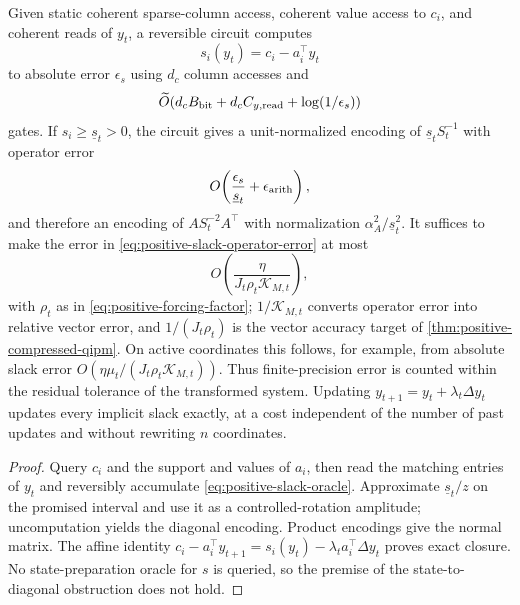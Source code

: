 \begin{theorem}
\label{thm:positive-implicit-slack}
Given static coherent sparse-column access, coherent value access to $c_i$,
and coherent reads of $y_t$, a
reversible circuit computes
\begin{equation}
 s_i(y_t)=c_i-a_i^\top y_t                                  \label{eq:positive-slack-oracle}
\end{equation}
to absolute error $\epsilon_s$ using $d_c$ column accesses and
\[
 \widetilde{O}\!\left(d_cB_{\rm bit}+d_cC_{y,{\rm read}}
                  +\log(1/\epsilon_s)\right)
\]
gates.  If
$s_i\geq\underline s_t>0$, the circuit gives a unit-normalized encoding of
$\underline s_tS_t^{-1}$ with operator error
\begin{equation}
 O\!\left(\frac{\epsilon_s}{\underline s_t}+\epsilon_{\rm arith}\right), \label{eq:positive-slack-operator-error}
\end{equation}
and therefore an encoding of $AS_t^{-2}A^\top$ with normalization
$\alpha_A^2/\underline s_t^2$.  It suffices to make the error in
\eqref{eq:positive-slack-operator-error} at most
\[
 O\!\left(\frac{\eta}{J_t\rho_t\mathcal K_{M,t}}\right),
\]
with $\rho_t$ as in \eqref{eq:positive-forcing-factor}; $1/\mathcal K_{M,t}$
converts operator error into relative vector error, and $1/(J_t\rho_t)$ is the
vector accuracy target of
\cref{thm:positive-compressed-qipm}.  On active coordinates this follows,
for example, from absolute slack error
$O(\eta\mu_t/(J_t\rho_t\mathcal K_{M,t}))$.  Thus finite-precision error is
counted within the residual tolerance of the transformed system.  Updating
$y_{t+1}=y_t+\lambda_t\Delta y_t$ updates every implicit slack exactly, at a
cost independent of the number of past updates and without rewriting $n$
coordinates.
\end{theorem}

\begin{proof}
Query $c_i$ and the support and values of $a_i$, then read the matching entries
of $y_t$ and reversibly accumulate \eqref{eq:positive-slack-oracle}.  Approximate
$\underline s_t/z$ on the promised interval and use it as a controlled-rotation
amplitude; uncomputation yields the diagonal encoding.  Product encodings give
the normal matrix.  The affine identity
$c_i-a_i^\top y_{t+1}=s_i(y_t)-\lambda_ta_i^\top\Delta y_t$ proves exact closure.
No state-preparation oracle for $s$ is queried, so the premise of the
state-to-diagonal obstruction does not hold.
\end{proof}

